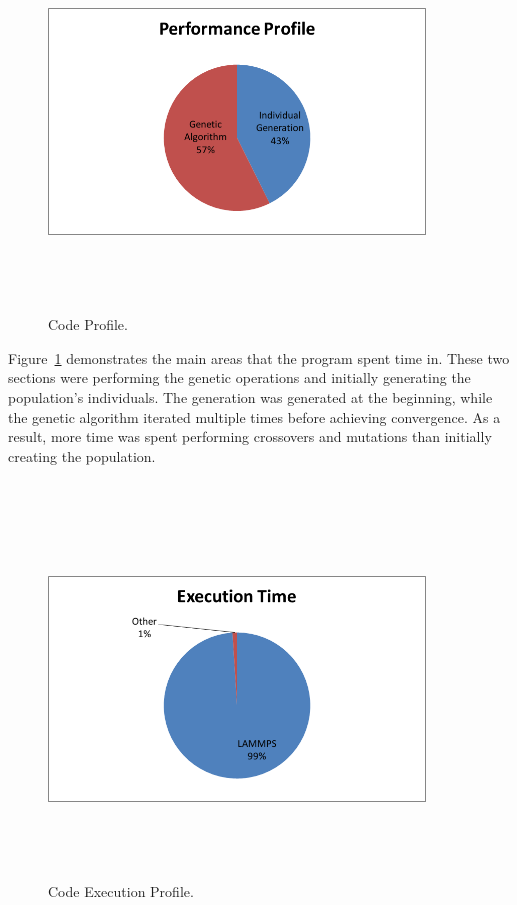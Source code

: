 \documentclass[letterpaper, 12pt]{article}
\begin{document}
\begin{flushleft}
~\newline
\begin{figure}[H]
	\centering
	\includegraphics[width=10cm,height=10cm,keepaspectratio]{profile.png}
	\caption[Profiling]{Code Profile.}
	\label{fig:codeprofile}
\end{figure}

Figure~\ref{fig:codeprofile} demonstrates the main areas that the program spent time in.  These two sections were performing the genetic operations and initially generating the population's individuals.  The generation was generated at the beginning, while the genetic algorithm iterated multiple times before achieving convergence.  As a result, more time was spent performing crossovers and mutations than initially creating the population. \\

~\newline
\begin{figure}[H]
	\centering
	\includegraphics[width=10cm,height=10cm,keepaspectratio]{execution.png}
	\caption[Execution]{Code Execution Profile.}
	\label{fig:execprofile}
\end{figure}


\end{flushleft}
\end{document}
